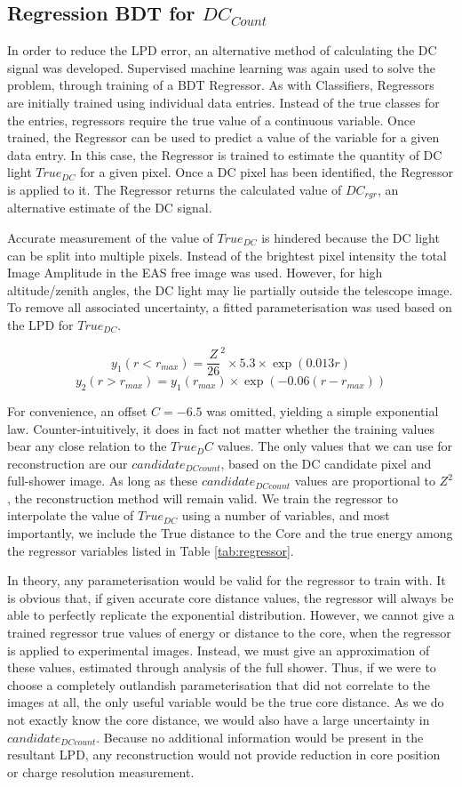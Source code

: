 \documentclass[11pt]{article}
\begin{document}
\subsection{Regression BDT for $DC_{Count}$}
In order to reduce the LPD error, an alternative method of calculating the DC signal was developed. Supervised machine learning was again used to solve the problem, through training of a BDT Regressor. As with Classifiers, Regressors are initially trained using individual data entries. Instead of the true classes for the entries, regressors require the true value of a continuous variable. Once trained, the Regressor can be used to predict a value of the variable for a given data entry. In this case, the Regressor is trained to estimate the quantity of DC light $True_{DC}$ for a given pixel. Once a DC pixel has been identified, the Regressor is applied to it. The Regressor returns the calculated value of $DC_{rgr}$, an alternative estimate of the DC signal. 

Accurate measurement of the value of $True_{DC}$ is hindered because the DC light can be split into multiple pixels. Instead of the brightest pixel intensity the total Image Amplitude in the EAS free image was used. However, for high altitude/zenith angles, the DC light may lie partially outside the telescope image. To remove all associated uncertainty, a fitted parameterisation was used based on the LPD for $True_{DC}$.

\[ y_{1}(r<r_{max}) = \frac{Z}{26}^{2} \times 5.3 \times \exp(0.013 r)\]
\[ y_{2}(r > r_{max}) = y_{1}(r_{max}) \times \exp (-0.06( r-r_{max})) \]

For convenience, an offset $C=-6.5$ was omitted, yielding a simple exponential law. Counter-intuitively, it does in fact not matter whether the training values bear any close relation to the $True_DC$ values. The only values that we can use for reconstruction are our $candidate_{DC count}$, based on the DC candidate pixel and full-shower image. As long as these $candidate_{DC count}$ values are proportional to $Z^{2}$, the reconstruction method will remain valid. We train the regressor to interpolate the value of $True_{DC}$ using a number of variables, and most importantly, we include the True distance to the Core and the true energy among the regressor variables listed in Table \ref{tab:regressor}. 

In theory, any parameterisation would be valid for the regressor to train with. It is obvious that, if given accurate core distance values, the regressor will always be able to perfectly replicate the exponential distribution. However, we cannot give a trained regressor true values of energy or distance to the core, when the regressor is applied to experimental images. Instead, we must give an approximation of these values, estimated through analysis of the full shower. Thus, if we were to choose a completely outlandish parameterisation that did not correlate to the images at all, the only useful variable would be the true core distance. As we do not exactly know the core distance, we would also have a large uncertainty in $candidate_{DC count}$. Because no additional information would be present in the resultant LPD, any reconstruction would not provide reduction in core position or charge resolution measurement. 
\end{document}
